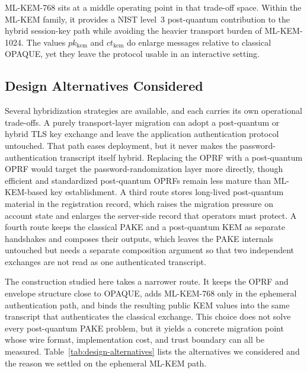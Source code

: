 \documentclass{ieeeijc}
\theoremstyle{remark}
\begin{document}
ML-KEM-768 sits at a middle operating point in that trade-off space.
Within the ML-KEM family, it provides a NIST level~3 post-quantum
contribution to the hybrid session-key path while avoiding
the heavier transport burden of ML-KEM-1024. The values
$pk_{\mathrm{kem}}$ and $ct_{\mathrm{kem}}$ do enlarge
messages relative to classical OPAQUE, yet they leave the protocol
usable in an interactive setting.

\subsection{Design Alternatives Considered}

Several hybridization strategies are available, and each carries its own
operational trade-offs. A purely transport-layer migration can adopt a
post-quantum or hybrid TLS key exchange and leave the application
authentication protocol untouched. That path eases deployment, but it
never makes the password-authentication transcript itself hybrid.
Replacing the OPRF with a post-quantum OPRF would target the
password-randomization layer more directly, though efficient and
standardized post-quantum OPRFs remain less mature than ML-KEM-based key
establishment. A third route stores long-lived post-quantum material in
the registration record, which raises the migration pressure on account
state and enlarges the server-side record that operators must protect.
A fourth route keeps the classical PAKE and a post-quantum KEM as
separate handshakes and composes their outputs, which leaves the PAKE
internals untouched but needs a separate composition argument so that
two independent exchanges are not read as one authenticated transcript.

The construction studied here takes a narrower route. It keeps the OPRF
and envelope structure close to OPAQUE, adds ML-KEM-768 only in the
ephemeral authentication path, and binds the resulting public KEM values
into the same transcript that authenticates the classical exchange. This
choice does not solve every post-quantum PAKE problem, but it yields a
concrete migration point whose wire format, implementation cost, and
trust boundary can all be measured.
Table~\ref{tab:design-alternatives} lists the alternatives we considered
and the reason we settled on the ephemeral ML-KEM path.
\end{document}
